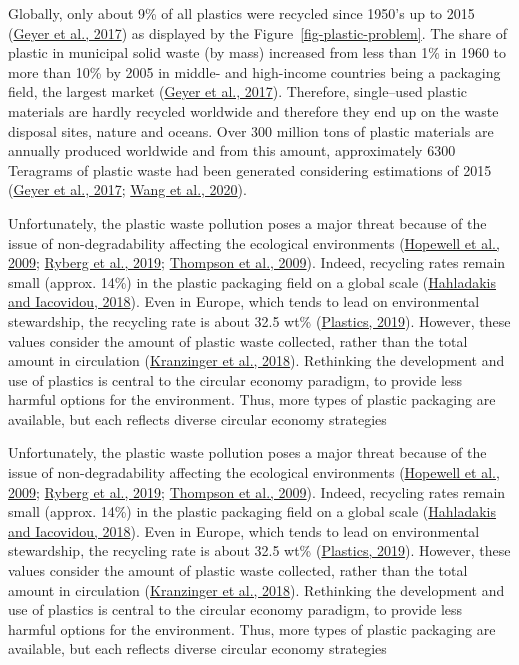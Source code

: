\documentclass[
  11pt,
]{article}
\begin{document}
Globally, only about 9\% of all plastics were recycled since 1950's up
to 2015 (\protect\hyperlink{ref-Geyer2017}{Geyer et al., 2017}) as
displayed by the Figure~\ref{fig-plastic-problem}. The share of plastic
in municipal solid waste (by mass) increased from less than 1\% in 1960
to more than 10\% by 2005 in middle- and high-income countries being a
packaging field, the largest market
(\protect\hyperlink{ref-Geyer2017}{Geyer et al., 2017}). Therefore,
single--used plastic materials are hardly recycled worldwide and
therefore they end up on the waste disposal sites, nature and oceans.
Over 300 million tons of plastic materials are annually produced
worldwide and from this amount, approximately 6300 Teragrams of plastic
waste had been generated considering estimations of 2015
(\protect\hyperlink{ref-Geyer2017}{Geyer et al., 2017};
\protect\hyperlink{ref-Wang2020a}{Wang et al., 2020}).

Unfortunately, the plastic waste pollution poses a major threat because
of the issue of non-degradability affecting the ecological environments
(\protect\hyperlink{ref-Hopewell2009}{Hopewell et al., 2009};
\protect\hyperlink{ref-Ryberg2019}{Ryberg et al., 2019};
\protect\hyperlink{ref-Thompson2009b}{Thompson et al., 2009}). Indeed,
recycling rates remain small (approx. 14\%) in the plastic packaging
field on a global scale
(\protect\hyperlink{ref-Hahladakis2018}{Hahladakis and Iacovidou,
2018}). Even in Europe, which tends to lead on environmental
stewardship, the recycling rate is about 32.5 wt\%
(\protect\hyperlink{ref-Plastics2019}{Plastics, 2019}). However, these
values consider the amount of plastic waste collected, rather than the
total amount in circulation
(\protect\hyperlink{ref-Kranzinger2018}{Kranzinger et al., 2018}).
Rethinking the development and use of plastics is central to the
circular economy paradigm, to provide less harmful options for the
environment. Thus, more types of plastic packaging are available, but
each reflects diverse circular economy strategies

Unfortunately, the plastic waste pollution poses a major threat because
of the issue of non-degradability affecting the ecological environments
(\protect\hyperlink{ref-Hopewell2009}{Hopewell et al., 2009};
\protect\hyperlink{ref-Ryberg2019}{Ryberg et al., 2019};
\protect\hyperlink{ref-Thompson2009b}{Thompson et al., 2009}). Indeed,
recycling rates remain small (approx. 14\%) in the plastic packaging
field on a global scale
(\protect\hyperlink{ref-Hahladakis2018}{Hahladakis and Iacovidou,
2018}). Even in Europe, which tends to lead on environmental
stewardship, the recycling rate is about 32.5 wt\%
(\protect\hyperlink{ref-Plastics2019}{Plastics, 2019}). However, these
values consider the amount of plastic waste collected, rather than the
total amount in circulation
(\protect\hyperlink{ref-Kranzinger2018}{Kranzinger et al., 2018}).
Rethinking the development and use of plastics is central to the
circular economy paradigm, to provide less harmful options for the
environment. Thus, more types of plastic packaging are available, but
each reflects diverse circular economy strategies
\end{document}
